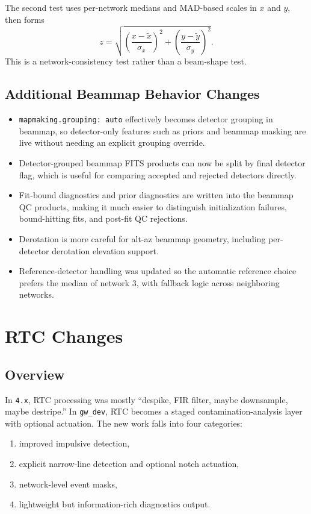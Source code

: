 \documentclass[11pt]{article}
\begin{document}
The second test uses per-network medians and MAD-based scales in \(x\) and \(y\),
then forms
\[
z = \sqrt{\left(\frac{x-\tilde{x}}{\sigma_x}\right)^2 +
\left(\frac{y-\tilde{y}}{\sigma_y}\right)^2 }.
\]
This is a network-consistency test rather than a beam-shape test.

\subsection{Additional Beammap Behavior Changes}

\begin{itemize}[leftmargin=1.5em]
\item \texttt{mapmaking.grouping: auto} effectively becomes detector grouping in
beammap, so detector-only features such as priors and beammap masking are live
without needing an explicit grouping override.
\item Detector-grouped beammap FITS products can now be split by final detector
flag, which is useful for comparing accepted and rejected detectors directly.
\item Fit-bound diagnostics and prior diagnostics are written into the beammap
QC products, making it much easier to distinguish initialization failures,
bound-hitting fits, and post-fit QC rejections.
\item Derotation is more careful for alt-az beammap geometry, including
per-detector derotation elevation support.
\item Reference-detector handling was updated so the automatic reference choice
prefers the median of network 3, with fallback logic across neighboring
networks.
\end{itemize}

\section{RTC Changes}

\subsection{Overview}

In \texttt{4.x}, RTC processing was mostly ``despike, FIR filter, maybe
downsample, maybe destripe.'' In \texttt{gw\_dev}, RTC becomes a staged
contamination-analysis layer with optional actuation. The new work falls into
four categories:

\begin{enumerate}[leftmargin=1.5em]
\item improved impulsive detection,
\item explicit narrow-line detection and optional notch actuation,
\item network-level event masks,
\item lightweight but information-rich diagnostics output.
\end{enumerate}
\end{document}

